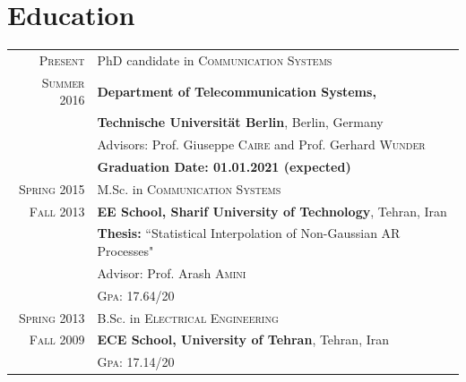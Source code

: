 \documentclass[a4paper,10pt]{article}
\begin{document}
\section{Education}
\begin{tabular}{rl}	
\textsc{Present} &PhD candidate in \textsc{ Communication Systems}\\
\textsc{Summer 2016} & \textbf{Department of Telecommunication Systems, }\\
~ & \textbf{Technische Universit\"{a}t Berlin},  Berlin, Germany\\
&  Advisors: Prof. Giuseppe \textsc{Caire} and Prof. Gerhard \textsc{Wunder}\\	
& \textbf{Graduation Date: 01.01.2021 (expected)}\vspace{3mm}\\
	
\textsc{Spring} 2015 & M.Sc. in \textsc{ Communication Systems}\\
\textsc{Fall 2013} & \textbf{EE School, Sharif University of Technology}, Tehran, Iran\\
& \textbf{Thesis:} ``Statistical Interpolation of Non-Gaussian AR Processes" \\
&  Advisor: Prof. Arash \textsc{Amini}\\
&\normalsize \textsc{Gpa}: 17.64/20\vspace{3mm}\\



\textsc{Spring} 2013& B.Sc. in \textsc{Electrical Engineering} \\
\textsc{Fall} 2009 & \textbf{ECE School, University of Tehran}, Tehran, Iran\\ 
&\normalsize \textsc{Gpa}: 17.14/20\\


%

\end{tabular}
\end{document}
